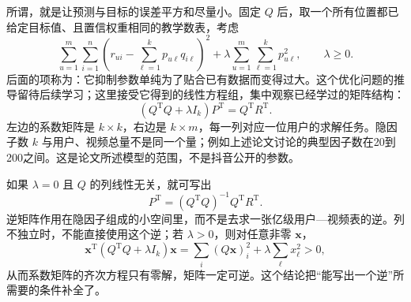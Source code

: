 \documentclass[a4paper,12pt,twoside,openany,fontset=none]{ctexbook}
\renewcommand{\geq}{\geqslant}
\let\oldsum\sum
\renewcommand{\sum}{\displaystyle\oldsum}
\numberwithin{equation}{chapter}
\begin{document}
所谓，就是让预测与目标的误差平方和尽量小。固定 $Q$ 后，取一个所有位置都已给定目标值、且置信权重相同的教学数表，考虑
\[
 \sum_{u=1}^{m}\sum_{i=1}^{n}
 \left(r_{ui}-\sum_{\ell=1}^{k}p_{u\ell}q_{i\ell}\right)^2
 +\lambda\sum_{u=1}^{m}\sum_{\ell=1}^{k}p_{u\ell}^2,
 \qquad \lambda\geq0.
\]
后面的项称为：它抑制参数单纯为了贴合已有数据而变得过大。这个优化问题的推导留待后续学习；这里接受它得到的线性方程组，集中观察已经学过的矩阵结构：
\[
 \boxed{(Q^{\mathrm T}Q+\lambda I_k)P^{\mathrm T}=Q^{\mathrm T}R^{\mathrm T}}.
\]
左边的系数矩阵是 $k\times k$，右边是 $k\times m$，每一列对应一位用户的求解任务。隐因子数 $k$ 与用户、视频总量不是同一个量；例如上述论文讨论的典型因子数在20到200之间。这是论文所述模型的范围，不是抖音公开的参数。\nobreak\cite{hu-als-2008}

如果 $\lambda=0$ 且 $Q$ 的列线性无关，就可写出
\[
 P^{\mathrm T}=(Q^{\mathrm T}Q)^{-1}Q^{\mathrm T}R^{\mathrm T}.
\]
逆矩阵作用在隐因子组成的小空间里，而不是去求一张亿级用户—视频表的逆。列不独立时，不能直接使用这个逆；若 $\lambda>0$，则对任意非零 $\boldsymbol x$，
\[
 \boldsymbol x^{\mathrm T}(Q^{\mathrm T}Q+\lambda I_k)\boldsymbol x
 =\sum_i(Q\boldsymbol x)_i^2+\lambda\sum_\ell x_\ell^2>0,
\]
从而系数矩阵的齐次方程只有零解，矩阵一定可逆。这个结论把“能写出一个逆”所需要的条件补全了。
\end{document}
